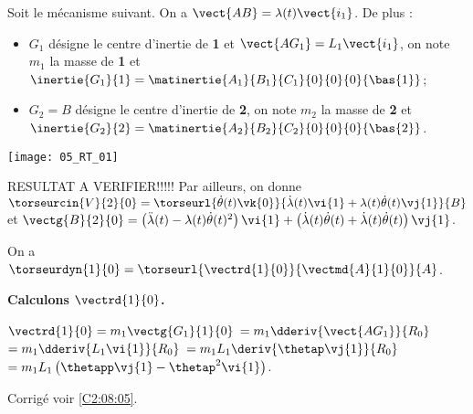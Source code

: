 \normaltrue
\correctionfalse


\setcounter{question}{0}
\ifcorrection
\else
{}
\fi

\ifprof
\else
Soit le mécanisme suivant. On a $\vect{AB}=\lambda(t)\vect{i_1}$. De plus :
\begin{itemize}
\item $G_1$ désigne le centre d'inertie de \textbf{1} et $\vect{AG_1}=L_1\vect{i_1}$, on note $m_1$ la masse de \textbf{1} et $\inertie{G_1}{1}=\matinertie{A_1}{B_1}{C_1}{0}{0}{0}{\bas{1}}$; 
\item $G_2=B$ désigne le centre d'inertie de \textbf{2}, on note $m_2$ la masse de \textbf{2} et $\inertie{G_2}{2}=\matinertie{A_2}{B_2}{C_2}{0}{0}{0}{\bas{2}}$.
\end{itemize}
\begin{center}
\texttt{[image: 05\_RT\_01]}
\end{center}

\ifcolle
\else
RESULTAT A VERIFIER!!!!!
Par ailleurs, on donne $\torseurcin{V}{2}{0} =\torseurl{\dot{\theta}(t)\vk{0}}{\dot{\lambda}(t)\vi{1}+\lambda(t)\dot{\theta}(t)\vj{1}}{B}$ et $\vectg{B}{2}{0} =  \left( \ddot{\lambda}(t)-\lambda(t)\dot{\theta}(t)^2\right)\vi{1}  +  \left( \dot{\lambda}(t)\dot{\theta}(t) +\dot{\lambda}(t)\dot{\theta}(t)\right) \vj{1}$.
\fi

\fi




\ifprof
On a $\torseurdyn{1}{0} = \torseurl{\vectrd{1}{0}}{\vectmd{A}{1}{0}}{A}$.

\textbf{Calculons $\vectrd{1}{0}$.}

$\vectrd{1}{0} = m_1 \vectg{G_1}{1}{0}$ $=m_1\dderiv{\vect{AG_1}}{R_0}$
$=m_1\dderiv{L_1\vi{1}}{R_0}$
$=m_1L_1\deriv{\thetap\vj{1}}{R_0}$
$=m_1L_1\left( \thetapp \vj{1} - \thetap^2 \vi{1} \right)$.

\else
\fi

\ifprof

\else
\fi

\ifcolle
{}

\else
\fi

\ifprof
\else
\begin{flushright}
\footnotesize{Corrigé  voir \ref{C2:08:05}.}
\end{flushright}%
\fi